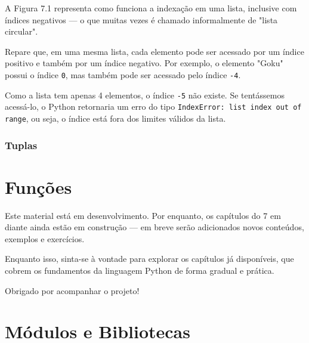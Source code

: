 \documentclass[12pt]{book}
\begin{document}
	A Figura 7.1 representa como funciona a indexação em uma lista, inclusive com índices negativos — o que muitas vezes é chamado informalmente de "lista circular".
	
	Repare que, em uma mesma lista, cada elemento pode ser acessado por um índice positivo e também por um índice negativo. Por exemplo, o elemento "Goku" possui o índice \texttt{0}, mas também pode ser acessado pelo índice \texttt{-4}.
	
	Como a lista tem apenas 4 elementos, o índice \texttt{-5} não existe.  
	Se tentássemos acessá-lo, o Python retornaria um erro do tipo \texttt{IndexError: list index out of range}, ou seja, o índice está fora dos limites válidos da lista.
	
	\subsection{Tuplas}
	
	

	
	\chapter{Funções}
	\begin{tcolorbox}[colback=yellow!10, colframe=black, title={\large\bfseries Nota ao leitor}]
		Este material está em desenvolvimento. Por enquanto, os capítulos do 7 em diante ainda estão em construção — em breve serão adicionados novos conteúdos, exemplos e exercícios.
		
		Enquanto isso, sinta-se à vontade para explorar os capítulos já disponíveis, que cobrem os fundamentos da linguagem Python de forma gradual e prática.
		
		Obrigado por acompanhar o projeto!
	\end{tcolorbox}
	
	\chapter{Módulos e Bibliotecas}
	
\end{document}
